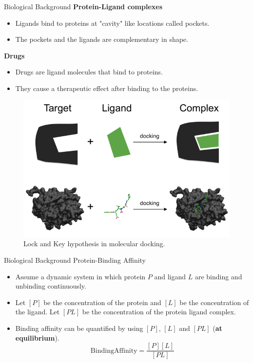 \documentclass{beamer}
\begin{document}
\begin{frame}[t]{Biological Background}
\textbf{Protein-Ligand complexes}

\begin{itemize}
\item Ligands bind to proteins at "cavity" like locations called pockets.
\item The pockets and the ligands are complementary in shape.
\end{itemize}

\textbf{Drugs}
\begin{itemize}
\item Drugs are ligand molecules that bind to proteins.
\item They cause a therapeutic effect after binding to the proteins.
\end{itemize}

\begin{figure}[htb]
  \centering
    \includegraphics[scale=0.45]{images/lock_and_key}
    \caption{Lock and Key hypothesis in molecular docking.}
    \label{fig:lockandkey}
\end{figure}


\end{frame}

\begin{frame}[t]{Biological Background}
Protein-Binding Affinity

\begin{itemize}
\item Assume a dynamic system in which protein $P$ and ligand $L$ are binding and unbinding continuously.
\item Let $[P]$ be the concentration of the protein and $[L]$ be the concentration of the ligand.
Let $[PL]$ be the concentration of the protein ligand complex.
\item Binding affinity can be quantified by using $[P]$, $[L]$ and $[PL]$ (\textbf{at equilibrium}).
$$\mathrm{Binding Affinity} = \frac{[P][L]}{[PL]}$$
\end{itemize}


\end{frame}
\end{document}
